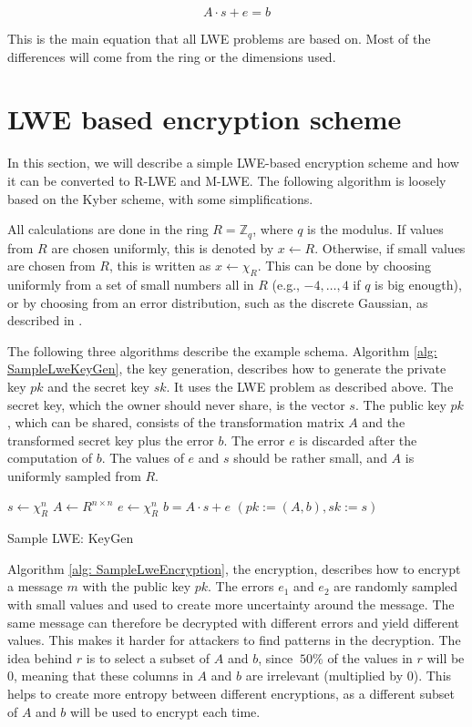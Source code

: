$$
  A \cdot s + e = b
$$

This is the main equation that all LWE problems are based on. Most of the differences will come from the ring or the dimensions used.


\section{LWE based encryption scheme}
\label{sec:Lwe-Encryption}

In this section, we will describe a simple LWE-based encryption scheme and how it can be converted to R-LWE and M-LWE. The following algorithm is loosely based on the Kyber \cite{CyrstalsKyber} scheme, with some simplifications.

All calculations are done in the ring $R = \mathbb{Z}_q$, where $q$ is the modulus. If values from $R$ are chosen uniformly, this is denoted by $x \leftarrow R$. Otherwise, if small values are chosen from $R$, this is written as $x \leftarrow \chi_R$. This can be done by choosing uniformly from a set of small numbers all in $R$ (e.g., ${-4,\ldots, 4}$ if $q$ is big enougth), or by choosing from an error distribution, such as the discrete Gaussian, as described in \cite{Regev2005OnLL}.

The following three algorithms describe the example schema. Algorithm \ref{alg: SampleLweKeyGen}, the key generation, describes how to generate the private key $pk$ and the secret key $sk$. It uses the LWE problem as described above. The secret key, which the owner should never share, is the vector $s$. The public key $pk$, which can be shared, consists of the transformation matrix $A$ and the transformed secret key plus the error $b$. The error $e$ is discarded after the computation of $b$. The values of $e$ and $s$ should be rather small, and $A$ is uniformly sampled from $R$.

\begin{algorithm}[htb]
  \begin{algorithmic}[1]
    \STATE $s \leftarrow \chi_R^n$
    \STATE $A \leftarrow R^{n \times n}$
    \STATE $e \leftarrow \chi_R^n$
    \STATE $b = A\cdot s+e$
    \RETURN $(pk:=(A, b), sk:=s )$
  \end{algorithmic}
  \caption{Sample LWE: KeyGen}
  \label{alg: SampleLweKeyGen}
\end{algorithm}

Algorithm \ref{alg: SampleLweEncryption}, the encryption, describes how to encrypt a message $m$ with the public key $pk$. The errors $e_1$ and $e_2$ are randomly sampled with small values and used to create more uncertainty around the message. The same message can therefore be decrypted with different errors and yield different values. This makes it harder for attackers to find patterns in the decryption. The idea behind $r$ is to select a subset of $A$ and $b$, since $~50\%$ of the values in $r$ will be $0$, meaning that these columns in $A$ and $b$ are irrelevant (multiplied by $0$). This helps to create more entropy between different encryptions, as a different subset of $A$ and $b$ will be used to encrypt each time.

